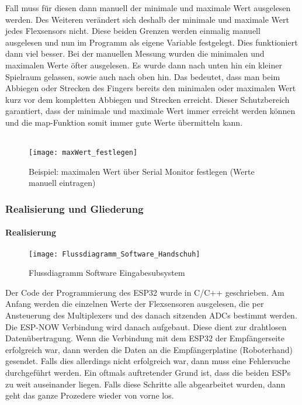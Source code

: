 \documentclass[titlepage,12pt,twoside]{article}
\begin{document}
Fall muss für diesen dann manuell der minimale und maximale Wert ausgelesen werden. 
Des Weiteren verändert sich deshalb der minimale und maximale Wert jedes Flexsensors 
nicht. Diese beiden Grenzen werden einmalig manuell ausgelesen und nun im Programm 
als eigene Variable festgelegt. Dies funktioniert dann viel besser. Bei der manuellen 
Messung wurden die minimalen und maximalen Werte öfter ausgelesen. Es wurde dann 
nach unten hin ein kleiner Spielraum gelassen, sowie auch nach oben hin. Das bedeutet, 
dass man beim Abbiegen oder Strecken des Fingers bereits den minimalen oder maximalen 
Wert kurz vor dem kompletten Abbiegen und Strecken erreicht. Dieser Schutzbereich 
garantiert, dass der minimale und maximale Wert immer erreicht werden können und die 
map-Funktion somit immer gute Werte übermitteln kann. \\
\\
\begin{figure}[H]
	\begin{center}
		\scalebox{0.7}
		{\texttt{[image: maxWert\_festlegen]}}
		\caption{Beispiel: maximalen Wert über Serial Monitor festlegen (Werte manuell eintragen)}
		\label{fig:maxWert_festlegen}			
	\end{center}
\end{figure}
\hfill \break

\subsubsection{Realisierung und Gliederung}
\paragraph{Realisierung}
\hfill \break
\hfill \break
\begin{figure}[H]
	\begin{center}
		\scalebox{0.5}
		{\texttt{[image: Flussdiagramm\_Software\_Handschuh]}}
		\caption{Flussdiagramm Software Eingabesubsystem}
		\label{fig:Flussdiagramm_Software_Handschuh}			
	\end{center}
\end{figure}
\hfill \break
Der Code der Programmierung des ESP32 wurde in C/C++ geschrieben. Am Anfang werden die einzelnen Werte der Flexsensoren 
ausgelesen, die per Ansteuerung des Multiplexers und des danach sitzenden ADCs bestimmt werden. Die ESP-NOW Verbindung wird 
danach aufgebaut. Diese dient zur drahtlosen Datenübertragung. Wenn die Verbindung mit dem ESP32 der Empfängerseite erfolgreich 
war, dann werden die Daten an die Empfängerplatine (Roboterhand) gesendet. Falls dies allerdings nicht erfolgreich war, dann 
muss eine Fehlersuche durchgeführt werden. Ein oftmals auftretender Grund ist, dass die beiden ESPs zu weit auseinander liegen. 
Falls diese Schritte alle abgearbeitet wurden, dann geht das ganze Prozedere wieder von vorne los. \\
\\
\end{document}
